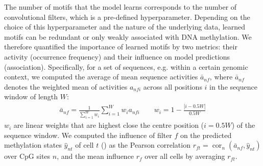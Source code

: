 The number of motifs that the model learns corresponds to the number of convolutional filters, which is a pre-defined hyperparameter. Depending on the choice of this hyperparameter and the nature of the underlying data, learned motifs can be redundant or only weakly associated with DNA methylation. We therefore quantified the importance of learned motifs by two metrics: their activity (occurrence frequency) and their influence on model predictions (association). Specifically, for a set of sequences, e.g. within a certain genomic context, we computed the average of mean sequence activities $\bar{a}_{nf}$, where $\bar{a}_{nf}$ denotes the weighted mean of activities $a_{nfi}$ across all positions $i$ in the sequence window of length $W$:
\begin{align}
  \bar{a}_{nf}=\frac{1}{\sum_{i=1}^W w_i} \sum_{i=1}^W w_i a_{nfi} \qquad w_i=1-\frac{|i-0.5W|}{0.5W}
\end{align}
$w_i$ are linear weights that are highest close the centre position ($i=0.5W$) of the sequence window. We computed the influence of filter $f$ on the predicted methylation states $\hat{y}_{nt}$ of cell $t$ () as the Pearson correlation $r_{ft}=\operatorname{cor}_n(\bar{a}_{nf},\hat{y}_{nt})$ over CpG sites $n$, and the mean influence $r_f$ over all cells by averaging $r_{ft}$.

